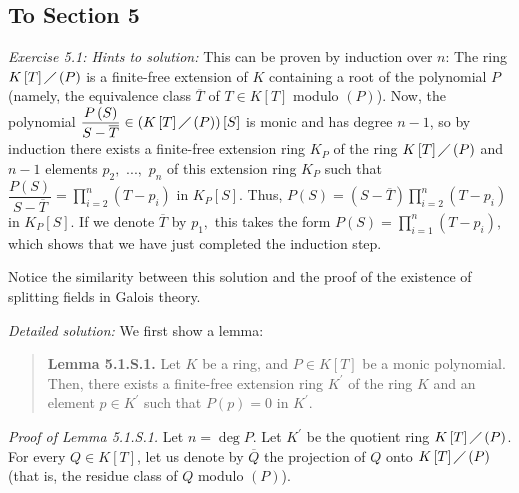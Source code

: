 \documentclass[numbers=enddot,12pt,final,onecolumn,notitlepage]{scrartcl}%
\begin{document}
\subsection{To Section 5}

\textit{Exercise 5.1: Hints to solution:} This can be proven by induction over
$n$: The ring $K\left[  T\right]  \diagup\left(  P\right)  $ is a finite-free
extension of $K$ containing a root of the polynomial $P$ (namely, the
equivalence class $\overline{T}$ of $T\in K\left[  T\right]  $ modulo $\left(
P\right)  $). Now, the polynomial $\dfrac{P\left(  S\right)  }{S-\overline{T}%
}\in\left(  K\left[  T\right]  \diagup\left(  P\right)  \right)  \left[
S\right]  $ is monic and has degree $n-1$, so by induction there exists a
finite-free extension ring $K_{P}$ of the ring $K\left[  T\right]
\diagup\left(  P\right)  $ and $n-1$ elements $p_{2},$ $...,$ $p_{n}$ of this
extension ring $K_{P}$ such that $\dfrac{P\left(  S\right)  }{S-\overline{T}%
}=\prod\limits_{i=2}^{n}\left(  T-p_{i}\right)  $ in $K_{P}\left[  S\right]
$. Thus, $P\left(  S\right)  =\left(  S-\overline{T}\right)  \prod
\limits_{i=2}^{n}\left(  T-p_{i}\right)  $ in $K_{P}\left[  S\right]  $. If we
denote $\overline{T}$ by $p_{1},$ this takes the form $P\left(  S\right)
=\prod\limits_{i=1}^{n}\left(  T-p_{i}\right)  ,$ which shows that we have
just completed the induction step.

Notice the similarity between this solution and the proof of the existence of
splitting fields in Galois theory.

\textit{Detailed solution:} We first show a lemma:

\begin{quote}
\textbf{Lemma 5.1.S.1.} Let $K$ be a ring, and $P\in K\left[  T\right]  $ be a
monic polynomial. Then, there exists a finite-free extension ring $K^{\prime}$
of the ring $K$ and an element $p\in K^{\prime}$ such that $P\left(  p\right)
=0$ in $K^{\prime}$.
\end{quote}

\textit{Proof of Lemma 5.1.S.1.} Let $n=\deg P$. Let $K^{\prime}$ be the
quotient ring $K\left[  T\right]  \diagup\left(  P\right)  $. For every $Q\in
K\left[  T\right]  $, let us denote by $\overline{Q}$ the projection of $Q$
onto $K\left[  T\right]  \diagup\left(  P\right)  $ (that is, the residue
class of $Q$ modulo $\left(  P\right)  $).
\end{document}
